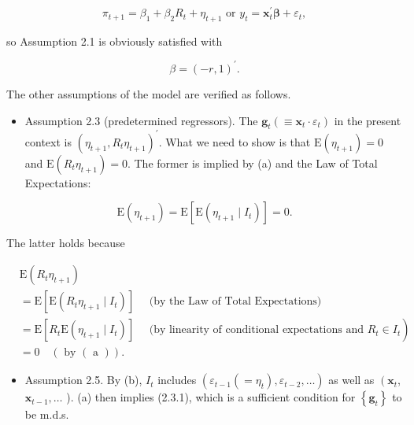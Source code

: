 \documentclass[10pt]{article}
\begin{document}
\begin{equation*}
\pi_{t+1}=\beta_{1}+\beta_{2} R_{t}+\eta_{t+1} \text { or } y_{t}=\mathbf{x}_{t}^{\prime} \boldsymbol{\beta}+\varepsilon_{t}, \tag{2.11.4}
\end{equation*}


so Assumption 2.1 is obviously satisfied with


\begin{equation*}
\beta=(-r, 1)^{\prime} . \tag{2.11.5}
\end{equation*}


The other assumptions of the model are verified as follows.

\begin{itemize}
  \item Assumption 2.3 (predetermined regressors). The $\mathbf{g}_{t}\left(\equiv \mathbf{x}_{t} \cdot \varepsilon_{t}\right)$ in the present context is $\left(\eta_{t+1}, R_{t} \eta_{t+1}\right)^{\prime}$. What we need to show is that $\mathrm{E}\left(\eta_{t+1}\right)=0$ and $\mathrm{E}\left(R_{t} \eta_{t+1}\right)=0$. The former is implied by (a) and the Law of Total Expectations:
\end{itemize}


\begin{equation*}
\mathrm{E}\left(\eta_{t+1}\right)=\mathrm{E}\left[\mathrm{E}\left(\eta_{t+1} \mid I_{t}\right)\right]=0 . \tag{2.11.6}
\end{equation*}


The latter holds because


\begin{align*}
& \mathrm{E}\left(R_{t} \eta_{t+1}\right) \\
& =\mathrm{E}\left[\mathrm{E}\left(R_{t} \eta_{t+1} \mid I_{t}\right)\right] \quad \text { (by the Law of Total Expectations) } \\
& \left.=\mathrm{E}\left[R_{t} \mathrm{E}\left(\eta_{t+1} \mid I_{t}\right)\right] \quad \text { (by linearity of conditional expectations and } R_{t} \in I_{t}\right) \\
& =0 \quad(\text { by }(\text { a })) . \tag{2.11.7}
\end{align*}


\begin{itemize}
  \item Assumption 2.5. By (b), $I_{t}$ includes $\left(\varepsilon_{t-1}\left(=\eta_{t}\right), \varepsilon_{t-2}, \ldots\right)$ as well as $\left(\mathbf{x}_{t}\right.$, $\mathbf{x}_{t-1}, \ldots$ ). (a) then implies (2.3.1), which is a sufficient condition for $\left\{\mathbf{g}_{t}\right\}$ to be m.d.s.
\end{itemize}
\end{document}
